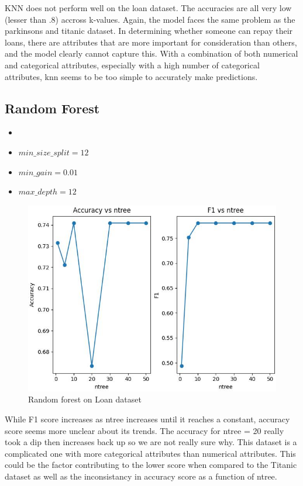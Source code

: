 \documentclass[letterpaper]{article}
\begin{document}
KNN does not perform well on the loan dataset. The accuracies are all very low (lesser than .8) accross k-values.
Again, the model faces the same problem as the parkinsons and titanic dataset. In determining whether someone can repay their loans, there are attributes that are more important for consideration than others,
and the model clearly cannot capture this. With a combination of both numerical and categorical attributes, especially with a high number of categorical attributes, knn seems to be too simple to accurately make predictions.

\subsection*{Random Forest}
\begin{itemize}
	\item {}
	\item $min\_size\_split = 12$
	\item $min\_gain = 0.01$
	\item $max\_depth = 12$
\end{itemize}

\begin{figure}[H]
	\includegraphics[width=\textwidth]{figures/forest_loan.csv_ig.jpg}
	\caption{Random forest on Loan dataset}
	\label{fig:forest-loan}
\end{figure}

While F1 score increases as ntree increases until it reaches a constant, accuracy score seems more unclear about its trends. The accuracy for
ntree = 20 really took a dip then increases back up so we are not really sure why. This dataset is a complicated one with more categorical attributes
than numerical attributes. This could be the factor contributing to the lower score when compared to the Titanic dataset as well as the inconsistancy
in accuracy score as a function of ntree.
\end{document}
